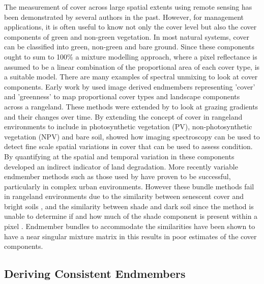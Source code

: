 \documentclass[remotesensing,article,accept,moreauthors,pdftex,12pt,a4paper]{mdpi}
\begin{document}
The measurement of cover across large spatial extents using remote sensing has been demonstrated by several authors in the past. However, for management applications, it is often useful to know not only the cover level but also the cover components of green and non-green vegetation. In most natural systems, cover can be classified into green, non-green and bare ground. Since these components ought to sum to 100\% a mixture modelling approach, where a pixel reflectance is assumed to be a linear combination of the proportional area of each cover type, is a suitable model. There are many examples of spectral unmixing to look at cover components. Early work by \citep{Pech1986a} used image derived endmembers representing 'cover' and 'greenness' to map proportional cover types and landscape components across a rangeland. These methods were extended by \citep{Pickup1998} to look at grazing gradients and their changes over time. By extending the concept of cover in rangeland environments to include in photosynthetic vegetation (PV), non-photosynthetic vegetation (NPV) and bare soil, \citep{Harris2003} showed how imaging spectroscopy can be used to detect fine scale spatial variations in cover that can be used to assess condition. By quantifying at the spatial and temporal variation in these components \citep{Roeder2007} developed an indirect indicator of land degradation. More recently variable endmember methods such as those used by \citep{Roberts1998} have proven to be successful, particularly in complex urban environments. However these bundle methods fail in rangeland environments due to the similarity between senescent cover and bright soils \citep{Asner2002}, and the similarity between shade and dark soil since the method is unable to determine if and how much of the shade component is present within a pixel \citep{Okin2001}. Endmember bundles to accommodate the similarities have been shown to have a near singular mixture matrix in this results in poor estimates of the cover components. 

\subsection{Deriving Consistent Endmembers}
\end{document}
